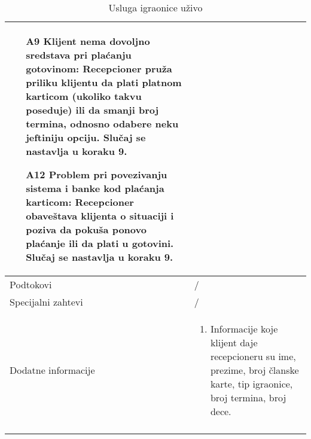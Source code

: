 \documentclass[../../main.tex]{subfiles}
\begin{document}
\begin{longtable}{| p{} | p{} |}
\begin{itemize}
        \item[A9] Klijent nema dovoljno sredstava  pri plaćanju gotovinom: Recepcioner pruža priliku klijentu da plati platnom karticom (ukoliko takvu poseduje) ili da smanji broj termina, odnosno odabere neku jeftiniju opciju. Slučaj se nastavlja u koraku 9.
        \item[A12] Problem pri povezivanju sistema i banke kod plaćanja karticom: Recepcioner obaveštava klijenta o situaciji i poziva da pokuša ponovo plaćanje ili da plati u gotovini. Slučaj se nastavlja u koraku 9.
    \end{itemize} \\
\hline
    Podtokovi & /\\
\hline
    Specijalni zahtevi & /\\
\hline
    Dodatne informacije &
    \begin{enumerate}
     \item Informacije koje klijent daje recepcioneru su ime, prezime, broj članske karte, tip igraonice, broj termina, broj dece.
    \end{enumerate}\\
\hline
\caption{Usluga igraonice uživo}
\end{longtable}
\end{document}
